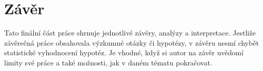 \chapter*{Závěr}

Tato finální část práce shrnuje jednotlivé závěry, analýzy a interpretace. Jestliže závěrečná práce obsahovala výzkumné otázky či hypotézy, v závěru nesmí chybět statistické vyhodnocení hypotéz. Je vhodné, když si autor na závěr uvědomí limity své práce a také možnosti, jak v daném tématu pokračovat.